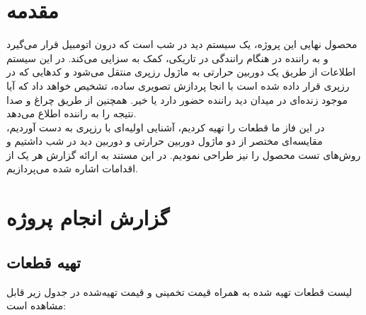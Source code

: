 \documentclass[12pt]{article}
\begin{document}
\newpage
\pagestyle{fancy}
\fancyhf{}
\fancyfoot{}
\cfoot{\thepage}
\chead{}

\newfontfamily{}

\KashidaOff
 \newcommand{\inlineLatin}[1]{
	\small{\lr{{\terminal #1}}}
}


\tableofcontents
\listoffigures
\listoftables

\newpage
\section{مقدمه}

محصول نهایی این پروژه، یک سیستم دید در شب است که درون اتومبیل قرار می‌گیرد و به راننده در هنگام رانندگی در تاریکی، کمک به سزایی می‌کند. در این سیستم اطلاعات از طریق یک دوربین حرارتی به ماژول رزپری منتقل می‌شود و کدهایی که در رزپری قرار داده شده است با انجا پردازش تصویری ساده، تشخیص خواهد داد که آیا موجود زنده‌ای در میدان دید راننده حضور دارد یا خیر. همچنین از طریق چراغ و صدا نتیجه را به راننده اطلاع می‌دهد.
\\

در این فاز ما قطعات را تهیه کردیم، آشنایی اولیه‌ای با رزپری به دست آوردیم، مقایسه‌ای مختصر از دو ماژول دوربین حرارتی و دوربین دید در شب داشتیم و روش‌های تست محصول را نیز طراحی نمودیم. در این مستند به ارائه گزارش هر یک از اقدامات اشاره شده می‌پردازیم.

\section{گزارش انجام پروژه}
\subsection{تهیه قطعات}

لیست قطعات تهیه شده به همراه قیمت تخمینی و قیمت تهیه‌شده در جدول زیر قابل مشاهده است:
\end{document}
